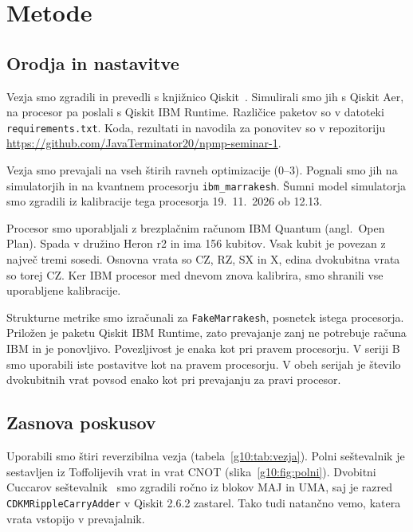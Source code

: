 \section{Metode}
\label{g10:sec:metode}

\subsection{Orodja in nastavitve}
\label{g10:sec:orodja}

Vezja smo zgradili in prevedli s knjižnico Qiskit~\cite{qiskit2024}.
Simulirali smo jih s Qiskit Aer,
na procesor pa poslali s Qiskit IBM Runtime.
Različice paketov so v datoteki \texttt{requirements.txt}.
Koda, rezultati in navodila za ponovitev so v repozitoriju
\url{https://github.com/JavaTerminator20/npmp-seminar-1}.

Vezja smo prevajali na vseh štirih ravneh optimizacije (0--3).
Pognali smo jih na simulatorjih
in na kvantnem procesorju \texttt{ibm\_marrakesh}.
Šumni model simulatorja smo zgradili iz kalibracije tega procesorja
19.~11.~2026 ob 12.13.

Procesor smo uporabljali z brezplačnim računom IBM Quantum
(angl.\ Open Plan).
Spada v družino Heron r2 in ima 156 kubitov.
Vsak kubit je povezan z največ tremi sosedi.
Osnovna vrata so CZ, RZ, SX in X,
edina dvokubitna vrata so torej CZ.
Ker IBM procesor med dnevom znova kalibrira,
smo shranili vse uporabljene kalibracije.

Strukturne metrike smo izračunali za \texttt{FakeMarrakesh},
posnetek istega procesorja.
Priložen je paketu Qiskit IBM Runtime, zato
prevajanje zanj ne potrebuje računa IBM in je ponovljivo.
Povezljivost je enaka kot pri pravem procesorju.
V seriji B smo uporabili iste postavitve
kot na pravem procesorju.
V obeh serijah je število dvokubitnih vrat
povsod enako kot pri prevajanju za pravi procesor.


\subsection{Zasnova poskusov}
\label{g10:sec:poskusi}

Uporabili smo štiri reverzibilna vezja (tabela~\ref{g10:tab:vezja}).
Polni seštevalnik je sestavljen iz Toffolijevih vrat in vrat CNOT
(slika~\ref{g10:fig:polni}).
Dvobitni Cuccarov seštevalnik~\cite{g10:cuccaro2004}
smo zgradili ročno iz blokov MAJ in UMA,
saj je razred \texttt{CDKMRippleCarryAdder} v Qiskit 2.6.2 zastarel.
Tako tudi natančno vemo, katera vrata vstopijo v prevajalnik.

